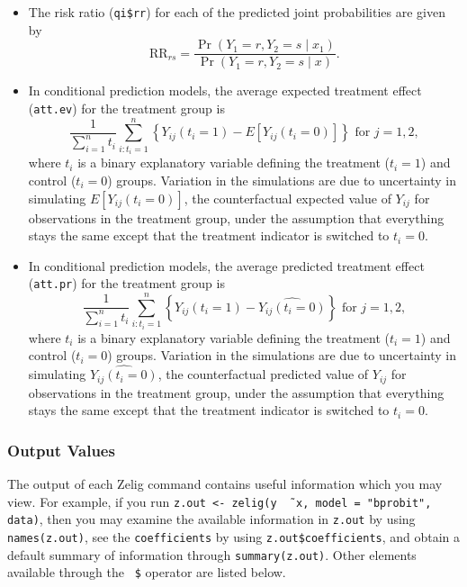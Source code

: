 \documentclass{article}
\begin{document}
\begin{itemize}
\item The risk ratio ({\tt qi\$rr}) for each of the predicted joint
  probabilities are given by
\begin{equation*}
\textrm{RR}_{rs} = \frac{\Pr(Y_1=r, Y_2=s \mid x_1)}{\Pr(Y_1=r, Y_2=s \mid x)}.
\end{equation*}

\item In conditional prediction models, the average expected treatment
  effect ({\tt att.ev}) for the treatment group is 
    \begin{equation*} \frac{1}{\sum_{i=1}^n t_i}\sum_{i:t_i=1}^n \left\{ Y_{ij}(t_i=1) -
      E[Y_{ij}(t_i=0)] \right\} \textrm{ for } j = 1,2,
    \end{equation*} 
    where $t_i$ is a binary explanatory variable defining the treatment
    ($t_i=1$) and control ($t_i=0$) groups.  Variation in the
    simulations are due to uncertainty in simulating $E[Y_{ij}(t_i=0)]$,
    the counterfactual expected value of $Y_{ij}$ for observations in the
    treatment group, under the assumption that everything stays the
    same except that the treatment indicator is switched to $t_i=0$.

\item In conditional prediction models, the average predicted treatment
  effect ({\tt att.pr}) for the treatment group is 
    \begin{equation*} \frac{1}{\sum_{i=1}^n t_i}\sum_{i:t_i=1}^n \left\{ Y_{ij}(t_i=1) -
      \widehat{Y_{ij}(t_i=0)}\right\} \textrm{ for } j = 1,2,
    \end{equation*} 
    where $t_i$ is a binary explanatory variable defining the treatment
    ($t_i=1$) and control ($t_i=0$) groups.  Variation in the
    simulations are due to uncertainty in simulating
    $\widehat{Y_{ij}(t_i=0)}$, the counterfactual predicted value of
    $Y_{ij}$ for observations in the treatment group, under the
    assumption that everything stays the same except that the
    treatment indicator is switched to $t_i=0$.

\end{itemize}

\subsubsection{Output Values}

The output of each Zelig command contains useful information which you
may view.  For example, if you run \texttt{z.out <- zelig(y \~\, x,
  model = "bprobit", data)}, then you may examine the available
information in \texttt{z.out} by using \texttt{names(z.out)},
see the {\tt coefficients} by using {\tt z.out\$coefficients}, and
obtain a default summary of information through
\texttt{summary(z.out)}.  Other elements available through the {\tt
  \$} operator are listed below.
\end{document}
